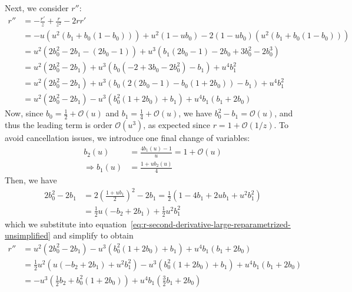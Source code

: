 \documentclass{article}
\begin{document}
Next, we consider $r''$:
%
\begin{align}
  r'' & = -\frac{r'}{z} + \frac{r}{z^2} - 2 r r'                                                                                                        \\
      & = -u(u^2 (b_1 + b_0(1-b_0))) + u^2 (1 - u b_0) - 2 (1 - u b_0) (u^2 (b_1 + b_0(1-b_0)))                                                         \\
      & = u^2 (2 b_0^2 - 2 b_1 - (2 b_0 - 1)) + u^3 (b_1 (2 b_0 - 1) - 2 b_0 + 3b_0^2 - 2 b_0^3)                                                        \\
      & = u^2 (2 b_0^2 - 2 b_1) + u^3 (b_0 (- 2 + 3b_0 - 2 b_0^2) - b_1) + u^4 b_1^2                                                                    \\
      & = u^2 (2 b_0^2 - 2 b_1) + u^3 (b_0 (2(2 b_0 - 1) - b_0 (1 + 2 b_0)) - b_1) + u^4 b_1^2                                                          \\
      & = u^2 (2 b_0^2 - 2 b_1) - u^3 (b_0^2 (1 + 2 b_0) + b_1) + u^4 b_1(b_1 + 2 b_0) \label{eq:r-second-derivative-large-reparametrized-unsimplified}
\end{align}
%
Now, since $b_0 = \frac{1}{2} + \mathcal{O}(u)$ and $b_1 = \frac{1}{4} + \mathcal{O}(u)$, we have $b_0^2 - b_1 = \mathcal{O}(u)$, and thus the leading term is order $\mathcal{O}(u^3)$, as expected since $r = 1 + \mathcal{O}(1/z)$.
To avoid cancellation issues, we introduce one final change of variables:
%
\begin{align}
  b_2(u)             & = \frac{4 b_1(u) - 1}{u} = 1 + \mathcal{O}(u) \label{eq:b2-reparametrized} \\
  \Rightarrow b_1(u) & = \frac{1 + u b_2(u)}{4} \label{eq:b1-reparametrized}
\end{align}
%
Then, we have
%
\begin{align}
  2 b_0^2 - 2 b_1 & = 2(\frac{1 + u b_1}{2})^2 - 2 b_1 = \frac{1}{2} (1 - 4 b_1 + 2 u b_1 + u^2 b_1^2) \\
                  & = \frac{1}{2} u (-b_2 + 2 b_1) + \frac{1}{2} u^2 b_1^2
\end{align}
%
which we substitute into equation~\eqref{eq:r-second-derivative-large-reparametrized-unsimplified} and simplify to obtain
%
\begin{align}
  r'' & = u^2 (2 b_0^2 - 2 b_1) - u^3 (b_0^2 (1 + 2 b_0) + b_1) + u^4 b_1(b_1 + 2 b_0)                          \\
      & = \frac{1}{2} u^2 (u (-b_2 + 2 b_1) + u^2 b_1^2) - u^3 (b_0^2 (1 + 2 b_0) + b_1) + u^4 b_1(b_1 + 2 b_0) \\
      & = -u^3 (\frac{1}{2}b_2 + b_0^2 (1 + 2 b_0)) + u^4 b_1 (\frac{3}{2} b_1 + 2 b_0)
\end{align}
\end{document}
